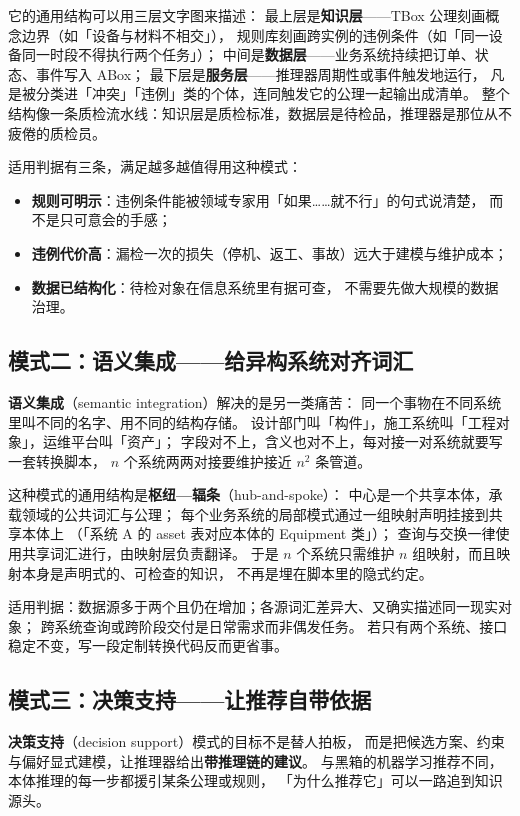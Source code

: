 它的通用结构可以用三层文字图来描述：
最上层是\textbf{知识层}——TBox 公理刻画概念边界（如「设备与材料不相交」），
规则库刻画跨实例的违例条件（如「同一设备同一时段不得执行两个任务」）；
中间是\textbf{数据层}——业务系统持续把订单、状态、事件写入 ABox；
最下层是\textbf{服务层}——推理器周期性或事件触发地运行，
凡是被分类进「冲突」「违例」类的个体，连同触发它的公理一起输出成清单。
整个结构像一条质检流水线：知识层是质检标准，数据层是待检品，推理器是那位从不疲倦的质检员。

适用判据有三条，满足越多越值得用这种模式：
\begin{itemize}
\item \textbf{规则可明示}：违例条件能被领域专家用「如果……就不行」的句式说清楚，
  而不是只可意会的手感；
\item \textbf{违例代价高}：漏检一次的损失（停机、返工、事故）远大于建模与维护成本；
\item \textbf{数据已结构化}：待检对象在信息系统里有据可查，
  不需要先做大规模的数据治理。
\end{itemize}

\subsection{模式二：语义集成——给异构系统对齐词汇}

\textbf{语义集成}（semantic integration）解决的是另一类痛苦：
同一个事物在不同系统里叫不同的名字、用不同的结构存储。
设计部门叫「构件」，施工系统叫「工程对象」，运维平台叫「资产」；
字段对不上，含义也对不上，每对接一对系统就要写一套转换脚本，
\(n\) 个系统两两对接要维护接近 \(n^2\) 条管道。

这种模式的通用结构是\textbf{枢纽—辐条}（hub-and-spoke）：
中心是一个共享本体，承载领域的公共词汇与公理；
每个业务系统的局部模式通过一组映射声明挂接到共享本体上
（「系统 A 的 asset 表对应本体的 Equipment 类」）；
查询与交换一律使用共享词汇进行，由映射层负责翻译。
于是 \(n\) 个系统只需维护 \(n\) 组映射，而且映射本身是声明式的、可检查的知识，
不再是埋在脚本里的隐式约定。

适用判据：数据源多于两个且仍在增加；各源词汇差异大、又确实描述同一现实对象；
跨系统查询或跨阶段交付是日常需求而非偶发任务。
若只有两个系统、接口稳定不变，写一段定制转换代码反而更省事。

\subsection{模式三：决策支持——让推荐自带依据}

\textbf{决策支持}（decision support）模式的目标不是替人拍板，
而是把候选方案、约束与偏好显式建模，让推理器给出\textbf{带推理链的建议}。
与黑箱的机器学习推荐不同，本体推理的每一步都援引某条公理或规则，
「为什么推荐它」可以一路追到知识源头。


